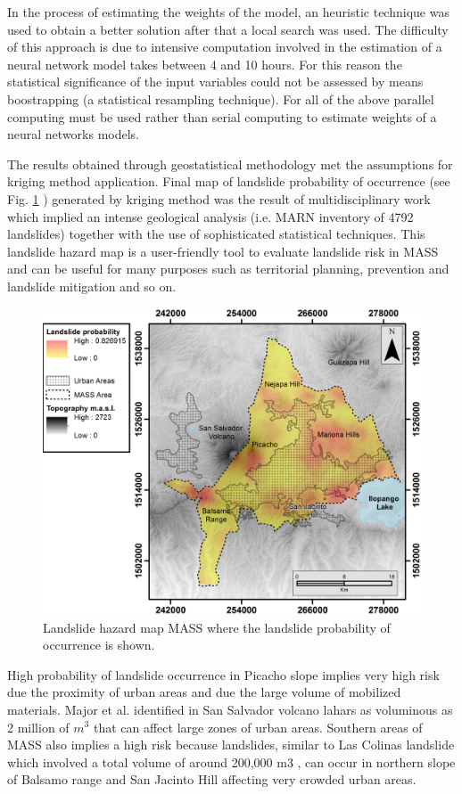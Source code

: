 \documentclass[11pt,twoside]{rmta2010esp}%
\begin{document}
In the process of estimating the weights of the model, an heuristic technique was used to obtain a better solution after that a local search was used. The difficulty of this approach is due to intensive computation involved in the estimation of a neural network model takes between 4 and 10 hours. For this reason the statistical significance of the input variables could not be assessed by means boostrapping  (a statistical resampling technique). For all of the above parallel computing must be used rather than serial computing to estimate weights of a neural networks models.



The results obtained through geostatistical methodology met the assumptions for kriging method application. Final map of landslide probability of occurrence (see Fig. \ref{fig:mass02} ) generated by kriging method was the result of multidisciplinary work which implied an intense geological analysis (i.e. MARN inventory of 4792 landslides) together with the use of sophisticated statistical techniques. This landslide hazard map is a user-friendly tool to evaluate landslide risk in MASS and can be useful for many purposes such as territorial planning, prevention and landslide mitigation and so on. 
\begin{center}
  \begin{figure}
   \centering
   \includegraphics[scale=0.73]{MASS_mapa_2}
   \caption{\small{Landslide hazard map MASS where the landslide probability of occurrence is shown.}}
   \label{fig:mass02}
  \end{figure}
 \end{center}
High probability of landslide occurrence in Picacho slope implies very high risk due the proximity of urban areas and due the large volume of mobilized materials. Major et al.\cite{major2004} identified in San Salvador volcano lahars as voluminous as 2 million of $m^{3}$ that can affect large zones of urban areas. Southern areas of MASS also implies a high risk because landslides, similar to Las Colinas landslide which involved a total volume of around 200,000 m3 \cite{evans}, can occur in northern slope of Balsamo range and San Jacinto Hill affecting very crowded urban areas.
\end{document}

